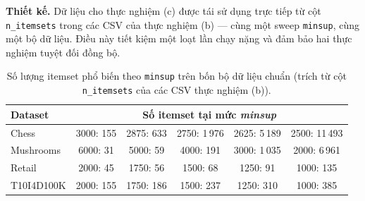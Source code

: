 \textbf{Thiết kế.} Dữ liệu cho thực nghiệm (c) được tái sử dụng trực tiếp từ cột \texttt{n\_itemsets} trong các CSV của thực nghiệm (b) --- cùng một sweep \texttt{minsup}, cùng một bộ dữ liệu. Điều này tiết kiệm một loạt lần chạy nặng và đảm bảo hai thực nghiệm tuyệt đối đồng bộ.

\begin{table}[htbp]
    \centering
    \caption{Số lượng itemset phổ biến theo \texttt{minsup} trên bốn bộ dữ liệu chuẩn (trích từ cột \texttt{n\_itemsets} của các CSV thực nghiệm (b)).}
    \label{tab:exp-c}
    \begin{tabular}{l|r|r|r|r|r}
        \hline
        \multicolumn{1}{l|}{\textbf{Dataset}} & \multicolumn{5}{c}{\textbf{Số itemset tại mức \textit{minsup}}} \\ \hline
        Chess       & \multicolumn{1}{c|}{3000: 155}   & \multicolumn{1}{c|}{2875: 633}   & \multicolumn{1}{c|}{2750: 1\,976} & \multicolumn{1}{c|}{2625: 5\,189} & \multicolumn{1}{c}{2500: 11\,493} \\
        Mushrooms   & \multicolumn{1}{c|}{6000: 31}    & \multicolumn{1}{c|}{5000: 59}    & \multicolumn{1}{c|}{4000: 191}    & \multicolumn{1}{c|}{3000: 1\,035} & \multicolumn{1}{c}{2000: 6\,961} \\
        Retail      & \multicolumn{1}{c|}{2000: 45}    & \multicolumn{1}{c|}{1750: 56}    & \multicolumn{1}{c|}{1500: 68}     & \multicolumn{1}{c|}{1250: 91}     & \multicolumn{1}{c}{1000: 135} \\
        T10I4D100K  & \multicolumn{1}{c|}{2000: 155}   & \multicolumn{1}{c|}{1750: 186}   & \multicolumn{1}{c|}{1500: 237}    & \multicolumn{1}{c|}{1250: 310}    & \multicolumn{1}{c}{1000: 385} \\
        \hline
    \end{tabular}
\end{table}

